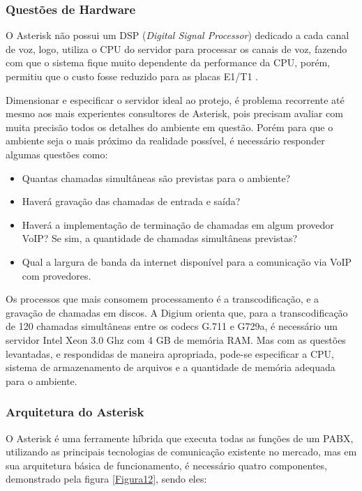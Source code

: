 \subsubsection{Questões de Hardware}
O Asterisk não possui um DSP (\textit{Digital Signal Processor}) dedicado a cada canal de voz, logo, utiliza o CPU do servidor para processar os canais de voz, fazendo com que o sistema fique muito dependente da performance da CPU, porém, permitiu que o custo fosse reduzido para as placas E1/T1 \cite{flavioeduardoandredade2005}.

Dimensionar e especificar o servidor ideal ao protejo, é problema recorrente até mesmo aos mais experientes consultores de Asterisk, pois precisam avaliar com muita precisão todos os detalhes do ambiente em questão. Porém para que o ambiente seja o mais próximo da realidade possível, é necessário responder algumas questões como: \cite{alexandrekeller2014}

\begin{itemize}
  \item Quantas chamadas simultâneas são previstas para o ambiente?
  \item Haverá gravação das chamadas de entrada e saída?
  \item Haverá a implementação de terminação de chamadas em algum provedor VoIP? Se sim, a quantidade de chamadas simultâneas previstas?
  \item Qual a largura de banda da internet disponível para a comunicação via VoIP com provedores.
\end{itemize}

Os processos que mais consomem processamento é a transcodificação, e a gravação de chamadas em discos. A Digium orienta que, para a transcodificação de 120 chamadas simultâneas entre os codecs G.711 e G729a, é necessário um servidor Intel Xeon 3.0 Ghz com 4 GB de memória RAM. Mas com as questões levantadas, e respondidas de maneira apropriada, pode-se especificar a CPU, sistema de armazenamento de arquivos e a quantidade de memória adequada para o ambiente. \cite{alexandrekeller2014}

\subsubsection{Arquitetura do Asterisk}
O Asterisk é uma ferramente híbrida que executa todas as funções de um PABX, utilizando as principais tecnologias de comunicação existente no mercado, mas em sua arquitetura básica de funcionamento, é necessário quatro componentes, demonstrado pela figura \ref{Figura12}, sendo eles: \cite{books/daglib/0018909}

